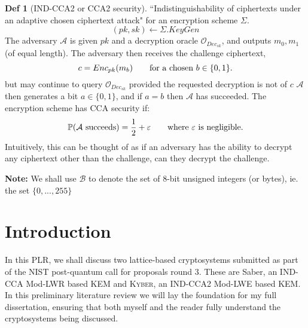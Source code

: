 \documentclass[a4paper, 10pt]{article}
\theoremstyle{definition}
\newtheorem{definition}{Def}[section]
\begin{document}
\begin{definition}[IND-CCA2 or CCA2 security]
    ``Indistinguishability of ciphertexts under an adaptive chosen ciphertext attack" for an encryption scheme $\Sigma$.\\
    \[(pk, sk) \leftarrow \Sigma.KeyGen \]
    The adversary $\mathcal{A} $ is given $pk$ and a decryption oracle $\mathcal{O}_{Dec_{sk}}$, and outputs $m_0, m_1$ (of equal length). The adversary then receives the challenge ciphertext,
    \[c=Enc_{pk}(m_b)\mbox{\qquad for a chosen }b \in \{ 0,1\}.\]
    but may continue to query $\mathcal{O}_{Dec_{sk}}$ provided the requested decryption is not of $c$
    $\mathcal{A} $ then generates a bit $a \in \{ 0, 1\}$, and if $a=b$ then $\mathcal{A} $ has succeeded.
    The encryption scheme has CCA security if:
    \[\mathbb{P} (\mathcal{A} \mbox{ succeeds}) = \frac{1}{2} + \varepsilon \mbox{\qquad where $\varepsilon$ is negligible.}\]
    Intuitively, this can be thought of as if an adversary has the ability to decrypt any ciphertext other than the challenge, can they decrypt the challenge.
\end{definition}

\textbf{Note:} We shall use $\mathcal{B} $ to denote the set of 8-bit unsigned integers (or bytes), ie. the set $\{0, ..., 255\}$



\newpage



\section{Introduction}

In this PLR, we shall discuss two lattice-based cryptosystems submitted as part of the \ac{NIST} post-quantum call for proposals round 3. These are Saber\cite{saber}, an \ac{IND}-\ac{CCA} Mod-\ac{LWR} based \ac{KEM} and \textsc{Kyber}\cite{crystals}, an \ac{IND}-\ac{CCA2} Mod-\ac{LWE} based \ac{KEM}. In this preliminary literature review we will lay the foundation for my full dissertation, ensuring that both myself and the reader fully understand the cryptosystems being discussed.\par
\end{document}
